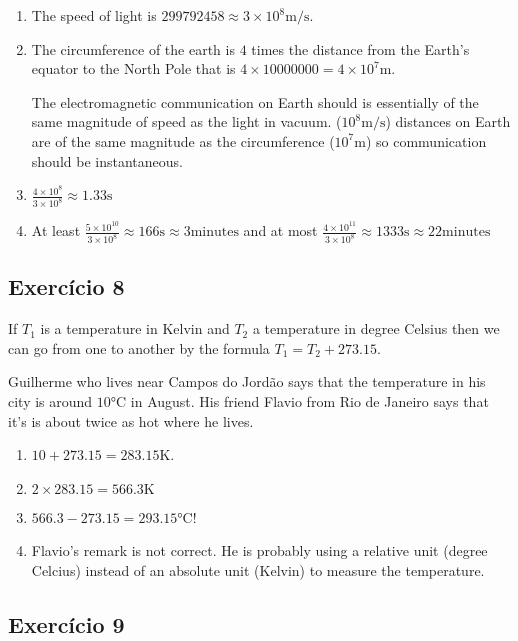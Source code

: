 \begin{enumerate}

\item The speed of light is
  $299792458 \approx 3 \times 10^8 \text{m}/\text{s}$.

\item The circumference of the earth is $4$ times
  the distance from the Earth's equator to the North Pole that is
  $4 \times 10000000 = 4 \times 10^7 \text{m}$.

  The electromagnetic communication on Earth should
  is essentially of the same magnitude of speed as the light in vacuum.
  ($10^8 \text{m}/\text{s}$) distances on Earth are of the same magnitude
  as the circumference ($10^7 \text{m}$) so communication should be
  instantaneous.

\item
  $\frac{4\times10^8}{3 \times 10^8} \approx 1.33 \text{s}$

\item
  At least
  $\frac{5\times10^{10}}{3 \times 10^8} \approx 166 \text{s} \approx 3
  \text{minutes}$ and at most
  $\frac{4\times10^{11}}{3 \times 10^8} \approx 1333 \text{s} \approx 
  22 \text{minutes}$
\end{enumerate}

\subsection*{Exercício 8}

If $T_1$ is a temperature in Kelvin and $T_2$ a temperature in degree Celsius
then we can go from one to another by the formula $T_1 = T_2 + 273.15$.

Guilherme who lives near Campos do Jordão says that the temperature in his
city is around $10\text{°C}$ in August. His friend Flavio from Rio de Janeiro
says that it's is about twice as hot where he lives.

\begin{enumerate}
\item $10+273.15=283.15\text{K}$.
\item $2 \times 283.15 = 566.3\text{K}$
\item $566.3 - 273.15 = 293.15\text{°C}$!
\item Flavio's remark is not correct. He is probably using a relative unit
  (degree Celcius) instead of an absolute unit (Kelvin) to measure the
  temperature.
\end{enumerate}

\subsection*{Exercício 9}

